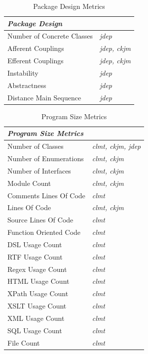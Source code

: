 \documentclass{sig-alternate}
\begin{document}
\begin{table}
\centering
\caption{Package Design Metrics}
\label{tbl:package-selected-metrics}
\begin{tabular}{l l}
 \hline
\multicolumn{2}{l}{\textit{\textbf{Package Design}}}\\
\hline
Number of Concrete Classes & \textit{jdep}\\
Afferent Couplings & \textit{jdep, ckjm}\\
Efferent Couplings & \textit{jdep, ckjm}\\
Instability & \textit{jdep}\\
Abstractness & \textit{jdep}\\
Distance Main Sequence & \textit{jdep}\\
\hline
\end{tabular}
\end{table}

\begin{table}
\centering
\caption{Program Size Metrics}
\label{tbl:size-selected-metrics}
\begin{tabular}{l l}
 \hline
\multicolumn{2}{l}{\textit{\textbf{Program Size Metrics}}}\\
\hline
Number of Classes & \textit{clmt, ckjm, jdep}\\
Number of Enumerations & \textit{clmt, ckjm}\\
Number of Interfaces & \textit{clmt, ckjm}\\
Module Count & \textit{clmt, ckjm}\\
Comments Lines Of Code & \textit{clmt}\\
Lines Of Code & \textit{clmt, ckjm}\\
Source Lines Of Code & \textit{clmt}\\
Function Oriented Code & \textit{clmt}\\
DSL Usage Count & \textit{clmt}\\
RTF Usage Count & \textit{clmt}\\
Regex Usage Count & \textit{clmt}\\
HTML Usage Count & \textit{clmt}\\
XPath Usage Count & \textit{clmt}\\
XSLT Usage Count & \textit{clmt}\\
XML Usage Count & \textit{clmt}\\
SQL Usage Count & \textit{clmt}\\
File Count & \textit{clmt}\\
\hline
\end{tabular}
\end{table}
\end{document}
